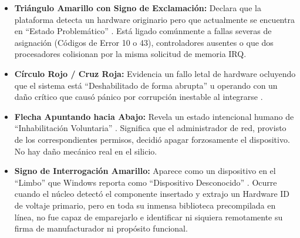 \documentclass[a4paper,12pt]{article}
\begin{document}
\begin{itemize}
    \item \textbf{Triángulo Amarillo con Signo de Exclamación:} Declara que la plataforma detecta un hardware originario pero que actualmente se encuentra en ``Estado Problemático'' \cite{ref83}. Está ligado comúnmente a fallas severas de asignación (Códigos de Error 10 o 43), controladores ausentes o que dos procesadores colisionan por la misma solicitud de memoria IRQ.
    \item \textbf{Círculo Rojo / Cruz Roja:} Evidencia un fallo letal de hardware ocluyendo que el sistema está ``Deshabilitado de forma abrupta'' u operando con un daño crítico que causó pánico por corrupción inestable al integrarse \cite{ref83}.
    \item \textbf{Flecha Apuntando hacia Abajo:} Revela un estado intencional humano de ``Inhabilitación Voluntaria'' \cite{ref83}. Significa que el administrador de red, provisto de los correspondientes permisos, decidió apagar forzosamente el dispositivo. No hay daño mecánico real en el silicio.
    \item \textbf{Signo de Interrogación Amarillo:} Aparece como un dispositivo en el ``Limbo'' que Windows reporta como ``Dispositivo Desconocido'' \cite{ref83}. Ocurre cuando el núcleo detectó el componente insertado y extrajo un Hardware ID de voltaje primario, pero en toda su inmensa biblioteca precompilada en línea, no fue capaz de emparejarlo e identificar ni siquiera remotamente su firma de manufacturador ni propósito funcional.
\end{itemize}
\end{document}
